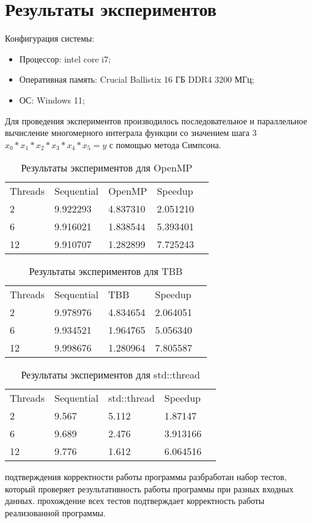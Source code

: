 \documentclass{report}
\begin{document}
\section*{Результаты экспериментов}
Конфигурация системы:

\begin{itemize}
\item Процессор: intel core i7;
\item Оперативная память: Crucial Ballistix 16 ГБ  DDR4 3200 МГц;
\item ОС: Windows 11;
\end{itemize}

\par Для проведения экспериментов производилось последовательное и параллельное вычисление многомерного интеграла функции со значением шага 3 $x_0 * x_1 * x_2 * x_3 * x_4 * x_5 = y$ с помощью метода Симпсона.

\begin{table}[!h]
\caption{Результаты экспериментов для OpenMP}
\centering
\begin{tabular}{lllll}
Threads & Sequential & OpenMP & Speedup  \\
2        & 9.922293        & 4.837310    & 2.051210       \\
6        & 9.916021        & 1.838544    & 5.393401      \\
12       & 9.910707        & 1.282899    & 7.725243       
\end{tabular}
\end{table}

\begin{table}[!h]
\caption{Результаты экспериментов для TBB}
\centering
\begin{tabular}{lllll}
Threads & Sequential & TBB & Speedup  \\
2        & 9.978976        & 4.834654    & 2.064051       \\
6        & 9.934521        & 1.964765    & 5.056340       \\
12       & 9.998676        & 1.280964    & 7.805587       
\end{tabular}
\end{table}

\begin{table}[!h]
\caption{Результаты экспериментов для std::thread}
\centering
\begin{tabular}{lllll}
Threads & Sequential & std::thread & Speedup  \\
2        & 9.567        & 5.112    & 1.87147       \\
6        & 9.689        & 2.476    & 3.913166       \\
12       & 9.776        & 1.612    & 6.064516       
\end{tabular}
\end{table}
 подтверждения корректности работы программы разбработан набор тестов, который проверяет результативность работы программы при разных входных данных.
 прохождение всех тестов подтверждает корректность работы реализованной программы.
\newpage
\end{document}
